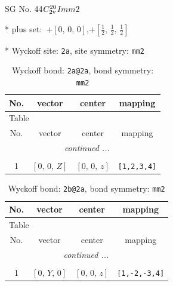 \documentclass[fleqn,8pt]{jsarticle}
\begin{document}
\setcounter{MaxMatrixCols}{32}

\renewcommand{\tablename}{Table~}
\renewcommand{\figurename}{Figure~}
\begin{center}
\LARGE
SG No. 44\quad$C_{\rm 2v}^{20}$\quad$Imm2$\quad[ orthorhombic ]
\end{center}

* plus set:\,\,\,$+\left[ 0,\, 0,\, 0 \right]$,\quad $+\left[ \frac{1}{2},\, \frac{1}{2},\, \frac{1}{2} \right]$


* Wyckoff site: {\tt 2a}, site symmetry: {\tt mm2}
\renewcommand{\arraystretch}{1.2}
\begin{longtable}{cccc}
\caption{Wyckoff bond: {\tt 2a@2a}, bond symmetry: {\tt mm2}}
 \\
 \hline \hline
No. & vector & center & mapping \\ \hline \endfirsthead

\multicolumn{3}{l}{\tablename\ \thetable{}} \\
 \hline \hline
No. & vector & center & mapping \\ \hline \endhead

 \hline \hline
\multicolumn{3}{r}{\footnotesize\it continued ...} \\ \endfoot

 \hline \hline
\multicolumn{3}{r}{} \\ \endlastfoot

1 & $\left[ 0,\, 0,\, Z \right]$ & $\left[ 0,\, 0,\, z \right]$ & {\tt [1,2,3,4]} \\
\end{longtable}
\renewcommand{\arraystretch}{1.2}
\begin{longtable}{cccc}
\caption{Wyckoff bond: {\tt 2b@2a}, bond symmetry: {\tt mm2}}
 \\
 \hline \hline
No. & vector & center & mapping \\ \hline \endfirsthead

\multicolumn{3}{l}{\tablename\ \thetable{}} \\
 \hline \hline
No. & vector & center & mapping \\ \hline \endhead

 \hline \hline
\multicolumn{3}{r}{\footnotesize\it continued ...} \\ \endfoot

 \hline \hline
\multicolumn{3}{r}{} \\ \endlastfoot

1 & $\left[ 0,\, Y,\, 0 \right]$ & $\left[ 0,\, 0,\, z \right]$ & {\tt [1,-2,-3,4]} \\
\end{longtable}
\end{document}
